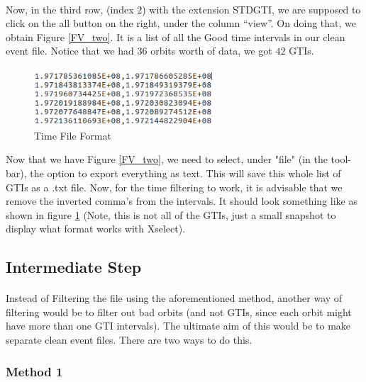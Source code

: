 \documentclass[a4paper,twoside]{report}
\numberwithin{equation}{section}
\begin{document}
\paragraph{}
Now, in the third row, (index $2$) with the extension STDGTI, we are supposed to click on the all button on the right, under the column “view”. On doing that, we obtain Figure \ref{FV_two}. It is a list of all the Good time intervals in our clean event file. Notice that we had $36$ orbits worth of data, we got $42$ GTIs.  
\paragraph{}
\begin{figure}
\includegraphics[width=1.0\linewidth, height=2cm]{Step_5.jpg}
\caption{Time File Format}
\label{step_5}
\end{figure}
Now that we have Figure \ref{FV_two}, we need to select, under "file" (in the tool-bar), the option to export everything as text. This will save this whole list of GTIs as a .txt file. Now, for the time filtering to work, it is advisable that we remove the inverted comma's from the intervals. It should look something like as shown in figure \ref{step_5} (Note, this is not all of the GTIs, just a small snapshot to display what format works with Xselect).
\paragraph{}
\newpage \clearpage
\subsection{Intermediate Step}
\paragraph{}
Instead of Filtering the file using the aforementioned method, another way of filtering would be to filter out bad orbits (and not GTIs, since each orbit might have more than one GTI intervals). The ultimate aim of this would be to make separate clean event files. There are two ways to do this. 
\subsubsection{Method 1}
\end{document}
